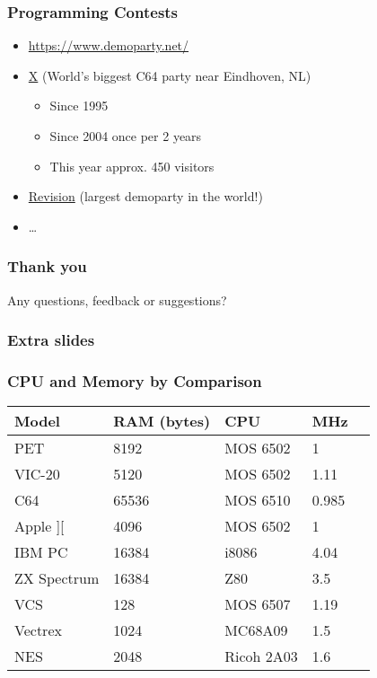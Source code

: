 \documentclass{beamer}
\begin{document}
\begin{frame}
\frametitle{Programming Contests}

\begin{itemize}
\item \url{https://www.demoparty.net/}
\item \href{https://xparty.net/}{X} (World's biggest C64 party near Eindhoven, NL)
\begin{itemize}
\item Since 1995
\item Since 2004 once per 2 years
\item This year approx. 450 visitors
\end{itemize}
\item \href{https://www.demoparty.net/revision}{Revision} (largest demoparty in the world!)
\item \dots
\end{itemize}

\end{frame}


{
\begin{frame}[plain]
\end{frame}
}

\begin{frame}

\frametitle{Thank you}

Any questions, feedback or suggestions?

\end{frame}


\begin{frame}
\frametitle{Extra slides}

\end{frame}


\begin{frame}
\frametitle{CPU and Memory by Comparison}

\begin{tabular}{|l|l|l|l|l|}
\hline Model & RAM (bytes) & CPU & MHz \\ \hline
PET & 8192 & MOS 6502 & 1 \\
VIC-20 & 5120 & MOS 6502 & 1.11 \\
C64 & 65536 & MOS 6510 & 0.985 \\ \hline
Apple ][ & 4096 & MOS 6502 & 1 \\
IBM PC & 16384 & i8086 & 4.04 \\
ZX Spectrum & 16384 & Z80 & 3.5 \\ \hline
VCS & 128 & MOS 6507 & 1.19 \\
Vectrex & 1024 & MC68A09 & 1.5 \\
NES & 2048 & Ricoh 2A03 & 1.6 \\ \hline
\end{tabular}

\end{frame}
\end{document}
